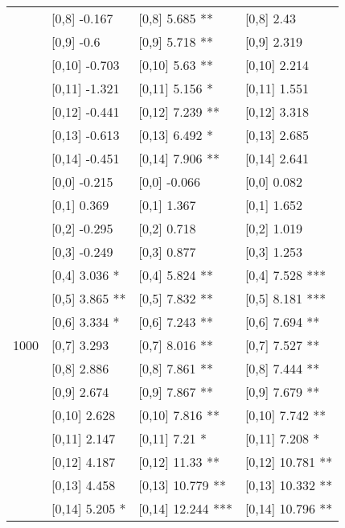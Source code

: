 \begin{table}
\begin{tabular}[t]{llll}
 & {}[0,8] -0.167 & {}[0,8] 5.685 ** & {}[0,8] 2.43\\
 & {}[0,9] -0.6 & {}[0,9] 5.718 ** & {}[0,9] 2.319\\
\addlinespace
 & {}[0,10] -0.703 & {}[0,10] 5.63 ** & {}[0,10] 2.214\\
 & {}[0,11] -1.321 & {}[0,11] 5.156 * & {}[0,11] 1.551\\
 & {}[0,12] -0.441 & {}[0,12] 7.239 ** & {}[0,12] 3.318\\
 & {}[0,13] -0.613 & {}[0,13] 6.492 * & {}[0,13] 2.685\\
 & {}[0,14] -0.451 & {}[0,14] 7.906 ** & {}[0,14] 2.641\\
\addlinespace
 & {}[0,0] -0.215 & {}[0,0] -0.066 & {}[0,0] 0.082\\
 & {}[0,1] 0.369 & {}[0,1] 1.367 & {}[0,1] 1.652\\
 & {}[0,2] -0.295 & {}[0,2] 0.718 & {}[0,2] 1.019\\
 & {}[0,3] -0.249 & {}[0,3] 0.877 & {}[0,3] 1.253\\
 & {}[0,4] 3.036 * & {}[0,4] 5.824 ** & {}[0,4] 7.528 ***\\
\addlinespace
 & {}[0,5] 3.865 ** & {}[0,5] 7.832 ** & {}[0,5] 8.181 ***\\
 & {}[0,6] 3.334 * & {}[0,6] 7.243 ** & {}[0,6] 7.694 **\\
1000 & {}[0,7] 3.293 & {}[0,7] 8.016 ** & {}[0,7] 7.527 **\\
 & {}[0,8] 2.886 & {}[0,8] 7.861 ** & {}[0,8] 7.444 **\\
 & {}[0,9] 2.674 & {}[0,9] 7.867 ** & {}[0,9] 7.679 **\\
\addlinespace
 & {}[0,10] 2.628 & {}[0,10] 7.816 ** & {}[0,10] 7.742 **\\
 & {}[0,11] 2.147 & {}[0,11] 7.21 * & {}[0,11] 7.208 *\\
 & {}[0,12] 4.187 & {}[0,12] 11.33 ** & {}[0,12] 10.781 **\\
 & {}[0,13] 4.458 & {}[0,13] 10.779 ** & {}[0,13] 10.332 **\\
 & {}[0,14] 5.205 * & {}[0,14] 12.244 *** & {}[0,14] 10.796 **\\
\bottomrule
\end{tabular}
\end{table}
